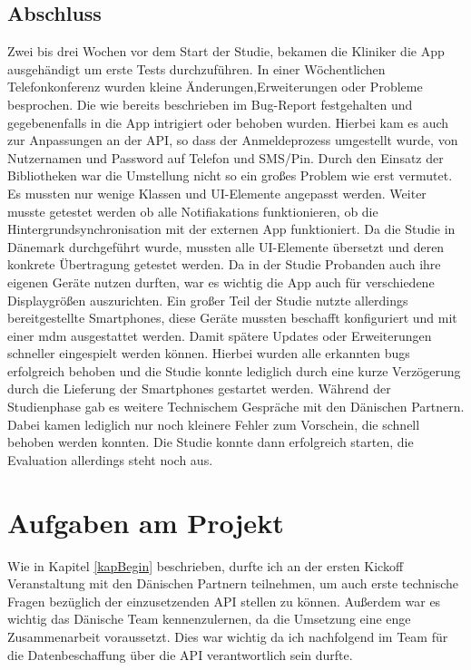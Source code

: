 \subsection{Abschluss}\label{abschluss}
Zwei bis drei Wochen vor dem Start der Studie, bekamen die Kliniker die App ausgehändigt um erste Tests durchzuführen. In einer Wöchentlichen Telefonkonferenz wurden kleine Änderungen,Erweiterungen oder  Probleme besprochen. Die wie bereits beschrieben im Bug-Report festgehalten  und gegebenenfalls in die App intrigiert oder behoben wurden. Hierbei kam es auch  zur Anpassungen an der API, so dass der Anmeldeprozess umgestellt wurde, von Nutzernamen und Password auf Telefon und SMS/Pin. Durch den Einsatz der Bibliotheken war die Umstellung nicht so ein großes Problem wie erst vermutet. Es mussten nur wenige Klassen und UI-Elemente angepasst werden. Weiter musste getestet werden ob alle Notifiakations funktionieren, ob die Hintergrundsynchronisation mit der externen App funktioniert. Da die Studie in Dänemark durchgeführt wurde, mussten  alle UI-Elemente übersetzt und deren konkrete Übertragung getestet werden. Da in der Studie Probanden auch ihre eigenen Geräte nutzen durften, war es wichtig die App auch für verschiedene Displaygrößen auszurichten. Ein großer Teil der Studie nutzte allerdings bereitgestellte Smartphones, diese Geräte mussten beschafft konfiguriert und mit einer \ac{mdm}%
ausgestattet werden. Damit spätere Updates oder Erweiterungen schneller eingespielt
 werden können. Hierbei wurden alle erkannten \gls{bug}s erfolgreich behoben und die Studie konnte lediglich durch eine kurze Verzögerung durch die Lieferung der Smartphones gestartet werden. Während der Studienphase gab es weitere Technischem Gespräche mit den Dänischen Partnern. Dabei kamen lediglich nur noch kleinere Fehler zum Vorschein, die schnell behoben werden konnten. Die Studie konnte dann erfolgreich starten, die Evaluation allerdings steht noch aus.

\section{Aufgaben am Projekt}
Wie in Kapitel \ref{kapBegin} beschrieben, durfte ich an der ersten Kickoff Veranstaltung mit den Dänischen Partnern teilnehmen, um auch erste technische Fragen bezüglich der einzusetzenden API stellen zu können. Außerdem war es wichtig das Dänische Team kennenzulernen, da die Umsetzung eine enge Zusammenarbeit voraussetzt. Dies war wichtig da ich nachfolgend im Team für die Datenbeschaffung über die API verantwortlich sein durfte.

